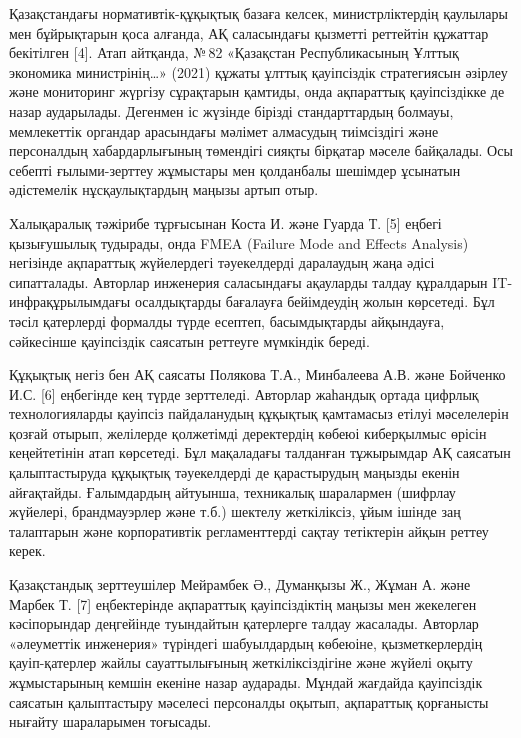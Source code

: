\begin{multicols}{2}
Қазақстандағы нормативтік-құқықтық базаға келсек, министрліктердің
қаулылары мен бұйрықтарын қоса алғанда, АҚ саласындағы қызметті
реттейтін құжаттар бекітілген {[}4{]}. Атап айтқанда, №\,82 «Қазақстан
Республикасының Ұлттық экономика министрінің\ldots» (2021) құжаты ұлттық
қауіпсіздік стратегиясын әзірлеу және мониторинг жүргізу сұрақтарын
қамтиды, онда ақпараттық қауіпсіздікке де назар аударылады. Дегенмен іс
жүзінде бірізді стандарттардың болмауы, мемлекеттік органдар арасындағы
мәлімет алмасудың тиімсіздігі және персоналдың хабардарлығының төмендігі
сияқты бірқатар мәселе байқалады. Осы себепті ғылыми-зерттеу жұмыстары
мен қолданбалы шешімдер ұсынатын әдістемелік нұсқаулықтардың маңызы
артып отыр.

Халықаралық тәжірибе тұрғысынан Коста И. және Гуарда Т. {[}5{]} еңбегі
қызығушылық тудырады, онда FMEA (Failure Mode and Effects Analysis)
негізінде ақпараттық жүйелердегі тәуекелдерді даралаудың жаңа әдісі
сипатталады. Авторлар инженерия саласындағы ақауларды талдау құралдарын
IT-инфрақұрылымдағы осалдықтарды бағалауға бейімдеудің жолын көрсетеді.
Бұл тәсіл қатерлерді формалды түрде есептеп, басымдықтарды айқындауға,
сәйкесінше қауіпсіздік саясатын реттеуге мүмкіндік береді.

Құқықтық негіз бен АҚ саясаты Полякова Т.А., Минбалеева А.В. және
Бойченко И.С. {[}6{]} еңбегінде кең түрде зерттеледі. Авторлар жаһандық
ортада цифрлық технологияларды қауіпсіз пайдаланудың құқықтық қамтамасыз
етілуі мәселелерін қозғай отырып, желілерде қолжетімді деректердің
көбеюі киберқылмыс өрісін кеңейтетінін атап көрсетеді. Бұл мақаладағы
талданған тұжырымдар АҚ саясатын қалыптастыруда құқықтық тәуекелдерді де
қарастырудың маңызды екенін айғақтайды. Ғалымдардың айтуынша, техникалық
шаралармен (шифрлау жүйелері, брандмауэрлер және т.б.) шектелу
жеткіліксіз, ұйым ішінде заң талаптарын және корпоративтік
регламенттерді сақтау тетіктерін айқын реттеу керек.

Қазақстандық зерттеушілер Мейрамбек Ә., Думанқызы Ж., Жұман А. және
Марбек Т. {[}7{]} еңбектерінде ақпараттық қауіпсіздіктің маңызы мен
жекелеген кәсіпорындар деңгейінде туындайтын қатерлерге талдау жасалады.
Авторлар «әлеуметтік инженерия» түріндегі шабуылдардың көбеюіне,
қызметкерлердің қауіп-қатерлер жайлы сауаттылығының жеткіліксіздігіне
және жүйелі оқыту жұмыстарының кемшін екеніне назар аударады. Мұндай
жағдайда қауіпсіздік саясатын қалыптастыру мәселесі персоналды оқытып,
ақпараттық қорғанысты нығайту шараларымен тоғысады.


\end{multicols}
